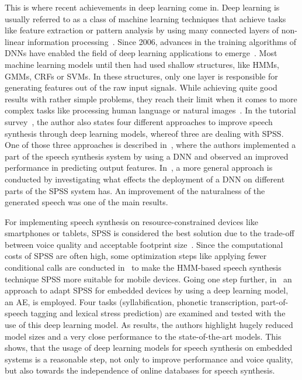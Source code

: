 This is where recent achievements in deep learning come in. Deep learning is usually referred to as a class of machine learning techniques that achieve tasks like feature extraction or pattern analysis by using many connected layers of non-linear information processing~\cite{ling:deep, li:survey}. Since 2006, advances in the training algorithms of \acp{DNN} have enabled the field of deep learning applications to emerge~\cite{boros:robust}. Most machine learning models until then had used shallow structures, like \acp{HMM}, \acp{GMM}, \acp{CRF} or \acp{SVM}. In these structures, only one layer is responsible for generating features out of the raw input signals. While achieving quite good results with rather simple problems, they reach their limit when it comes to more complex tasks like processing human language or natural images~\cite{li:survey}. In the tutorial survey~\cite{li:survey}, the author also states four different approaches to improve speech synthesis through deep learning models, whereof three are dealing with \ac{SPSS}. One of those three approaches is described in~\cite{zen:deepstatistical}, where the authors implemented a part of the speech synthesis system by using a \ac{DNN} and observed an improved performance in predicting output features. In~\cite{hashimoto:effect}, a more general approach is conducted by investigating what effects the deployment of a \ac{DNN} on different parts of the \ac{SPSS} system has. An improvement of the naturalness of the generated speech was one of the main results.

For implementing speech synthesis on resource-constrained devices like smartphones or tablets, \ac{SPSS} is considered the best solution due to the trade-off between voice quality and acceptable footprint size~\cite{toth:optimizing}. Since the computational costs of \ac{SPSS} are often high, some optimization steps like applying fewer conditional calls are conducted in~\cite{toth:optimizing} to make the \ac{HMM}-based speech synthesis technique \ac{SPSS} more suitable for mobile devices. Going one step further, in~\cite{boros:robust} an approach to adapt \ac{SPSS} for embedded devices by using a deep learning model, an \ac{AE}, is employed. Four tasks (syllabification, phonetic transcription, part-of-speech tagging and lexical stress prediction) are examined and tested with the use of this deep learning model. As results, the authors highlight hugely reduced model sizes and a very close performance to the state-of-the-art models. This shows, that the usage of deep learning models for speech synthesis on embedded systems is a reasonable step, not only to improve performance and voice quality, but also towards the independence of online databases for speech synthesis.


